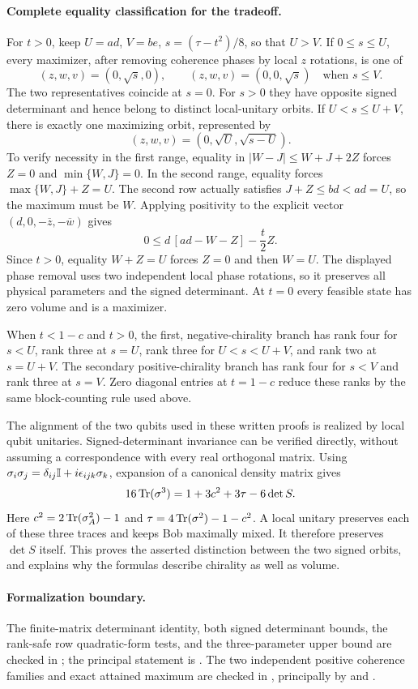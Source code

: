\paragraph{Complete equality classification for the tradeoff.}
For $t>0$, keep $U=ad$, $V=be$, $s=(\tau-t^2)/8$, so that $U>V$.
If $0\leq s\leq U$, every maximizer, after removing coherence phases by
local $z$ rotations, is one of
\[
 (z,w,v)=(0,\sqrt s,0),\qquad
 (z,w,v)=(0,0,\sqrt s)\quad\text{when }s\leq V.
\]
The two representatives coincide at $s=0$. For $s>0$ they have opposite
signed determinant and hence belong to distinct local-unitary orbits.
If $U<s\leq U+V$, there is exactly one maximizing orbit, represented by
\[
 (z,w,v)=(0,\sqrt U,\sqrt{s-U}).
\]
To verify necessity in the first range, equality in
$|W-J|\leq W+J+2Z$ forces $Z=0$ and $\min\{W,J\}=0$.
In the second range, equality forces $\max\{W,J\}+Z=U$.
The second row actually satisfies $J+Z\leq bd<ad=U$, so the maximum must
be $W$. Applying positivity to the explicit vector
$(d,0,-\overline z,-\overline w)$ gives
\[
 0\leq d\,[ad-W-Z]-\frac t2Z.
\]
Since $t>0$, equality $W+Z=U$ forces $Z=0$ and then $W=U$.
The displayed phase removal uses two independent local phase rotations,
so it preserves all physical parameters and the signed determinant.
At $t=0$ every feasible state has zero volume and is a maximizer.

When $t<1-c$ and $t>0$, the first, negative-chirality branch has rank four
for $s<U$, rank three at $s=U$, rank three for $U<s<U+V$, and rank two
at $s=U+V$. The secondary positive-chirality branch has rank four for
$s<V$ and rank three at $s=V$. Zero diagonal entries at $t=1-c$ reduce
these ranks by the same block-counting rule used above.

The alignment of the two qubits used in these written proofs is realized by
local qubit unitaries. Signed-determinant invariance can be verified directly,
without assuming a correspondence with every real orthogonal matrix.
Using $\sigma_i\sigma_j=\delta_{ij}\mathbb I+i\epsilon_{ijk}\sigma_k$, expansion
of a canonical density matrix gives
\[
 16\operatorname{Tr}(\sigma^3)=1+3c^2+3\tau-6\det S.
\]
Here $c^2=2\operatorname{Tr}(\sigma_A^2)-1$ and
$\tau=4\operatorname{Tr}(\sigma^2)-1-c^2$. A local unitary preserves each of these
three traces and keeps Bob maximally mixed. It therefore preserves
$\det S$ itself. This proves the asserted distinction between the two
signed orbits, and explains why the formulas describe chirality as well
as volume.

\paragraph{Formalization boundary.}
The finite-matrix determinant identity, both signed determinant bounds,
the rank-safe row quadratic-form tests, and the three-parameter upper
bound are checked in ; the principal
statement is .
The two independent positive coherence families and exact attained maximum
are checked in , principally by
 and
.

